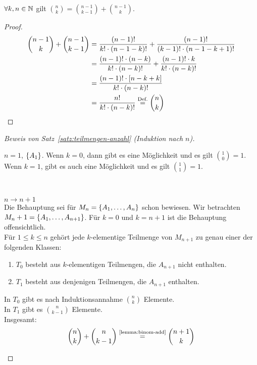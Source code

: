 \begin{lemma}
    \label{lemma:binom-add}
    $\forall k,n\in\N$ gilt $\binom{n}{k} = \binom{n-1}{k-1} + \binom{n-1}{k}$.
    \begin{proof}
        \begin{align*}
            \binom{n-1}{k} + \binom{n-1}{k-1} &= \frac{(n-1)!}{k!\cdot(n-1-k)!} + \frac{(n-1)!}{(k-1)!\cdot(n-1-k+1)!}\\
            &= \frac{(n-1)!\cdot(n-k)}{k!\cdot(n-k)!} + \frac{(n-1)!\cdot k}{k!\cdot(n-k)!}\\
            &= \frac{(n-1)!\cdot\interv{n-k+k}}{k!\cdot(n-k)!}\\
            &= \frac{n!}{k!\cdot(n-k)!} \annot{=}{Def.} \binom{n}{k}\qedhere
        \end{align*}
    \end{proof}
\end{lemma}
\begin{proof}[Beweis von Satz~\ref{satz:teilmengen-anzahl} (Induktion nach $n$)]
    ~\\
    \begin{induktionsanfang}
        $n=1$, $\set{A_1}$. Wenn $k=0$, dann gibt es eine Möglichkeit und es gilt $\binom{1}{0} = 1$. Wenn $k=1$, gibt es auch eine Möglichkeit und es gilt $\binom{1}{1} = 1$.\\
    \end{induktionsanfang}
    \\
    \begin{induktionsschritt}
        $n\rightarrow n+1$\\
        Die Behauptung sei für $M_n=\set{A_1, \dots, A_n}$ schon bewiesen. Wir betrachten $M_n+1 = \set{A_1, \dots, A_{n+1}}$. Für $k=0$ und $k=n+1$ ist die Behauptung offensichtlich.\\
        Für $1\leq k \leq n$ gehört jede $k$-elementige Teilmenge von $M_{n+1}$ zu genau einer der folgenden Klassen:
        \begin{enumerate}
            \item $T_0$ besteht aus $k$-elementigen Teilmengen, die $A_{n+1}$ nicht enthalten.
            \item $T_1$ besteht aus denjenigen Teilmengen, die $A_{n+1}$ enthalten.
        \end{enumerate}
        \noindent In $T_0$ gibt es nach Induktionsannahme $\binom{n}{k}$ Elemente.\\
        In $T_1$ gibt es $\binom{n}{k-1}$ Elemente\footnotemark.\\
        Insgesamt:
        \begin{equation*}
            \binom{n}{k}+\binom{n}{k-1}\annot{=}{\ref{lemma:binom-add}}\binom{n+1}{k}\qedhere
        \end{equation*}
    \end{induktionsschritt}
\end{proof}

